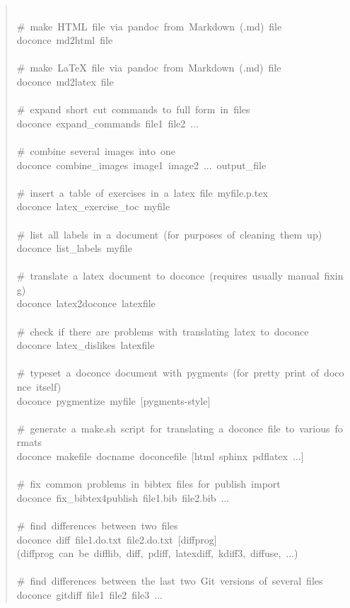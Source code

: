 \documentclass[a4paper]{article}
\begin{document}
\begin{quote}
{~\\
\#~make~HTML~file~via~pandoc~from~Markdown~(.md)~file\\
doconce~md2html~file\\
~\\
\#~make~LaTeX~file~via~pandoc~from~Markdown~(.md)~file\\
doconce~md2latex~file\\
~\\
\#~expand~short~cut~commands~to~full~form~in~files\\
doconce~expand\_commands~file1~file2~...\\
~\\
\#~combine~several~images~into~one\\
doconce~combine\_images~image1~image2~...~output\_file\\
~\\
\#~insert~a~table~of~exercises~in~a~latex~file~myfile.p.tex\\
doconce~latex\_exercise\_toc~myfile\\
~\\
\#~list~all~labels~in~a~document~(for~purposes~of~cleaning~them~up)\\
doconce~list\_labels~myfile\\
~\\
\#~translate~a~latex~document~to~doconce~(requires~usually~manual~fixing)\\
doconce~latex2doconce~latexfile\\
~\\
\#~check~if~there~are~problems~with~translating~latex~to~doconce\\
doconce~latex\_dislikes~latexfile\\
~\\
\#~typeset~a~doconce~document~with~pygments~(for~pretty~print~of~doconce~itself)\\
doconce~pygmentize~myfile~{[}pygments-style{]}\\
~\\
\#~generate~a~make.sh~script~for~translating~a~doconce~file~to~various~formats\\
doconce~makefile~docname~doconcefile~{[}html~sphinx~pdflatex~...{]}\\
~\\
\#~fix~common~problems~in~bibtex~files~for~publish~import\\
doconce~fix\_bibtex4publish~file1.bib~file2.bib~...\\
~\\
\#~find~differences~between~two~files\\
doconce~diff~file1.do.txt~file2.do.txt~{[}diffprog{]}\\
(diffprog~can~be~difflib,~diff,~pdiff,~latexdiff,~kdiff3,~diffuse,~...)\\
~\\
\#~find~differences~between~the~last~two~Git~versions~of~several~files\\
doconce~gitdiff~file1~file2~file3~...
}
\end{quote}
\end{document}
